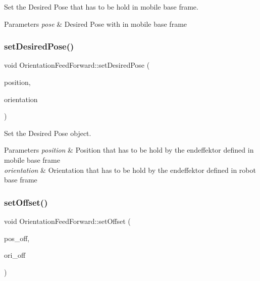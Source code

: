 Set the Desired Pose that has to be hold in mobile base frame. 


\begin{DoxyParams}{Parameters}
{\em pose} & Desired Pose with in mobile base frame \\
\hline
\end{DoxyParams}
\mbox{\label{classOrientationFeedForward_ad419aebf0df88282ca6c1dc24adbadb2}} 
\subsubsection{\texorpdfstring{set\+Desired\+Pose()}{setDesiredPose()}\hspace{0.1cm}{\footnotesize\ttfamily [2/2]}}
{\footnotesize\ttfamily void Orientation\+Feed\+Forward\+::set\+Desired\+Pose (\begin{DoxyParamCaption}\item[{Position}]{position,  }\item[{Orientation}]{orientation }\end{DoxyParamCaption})}



Set the Desired Pose object. 


\begin{DoxyParams}{Parameters}
{\em position} & Position that has to be hold by the endeffektor defined in mobile base frame \\
\hline
{\em orientation} & Orientation that has to be hold by the endeffektor defined in robot base frame \\
\hline
\end{DoxyParams}
\mbox{\label{classOrientationFeedForward_adc105d9a1fe00d6a79fcf38447202709}} 
\subsubsection{\texorpdfstring{set\+Offset()}{setOffset()}\hspace{0.1cm}{\footnotesize\ttfamily [1/2]}}
{\footnotesize\ttfamily void Orientation\+Feed\+Forward\+::set\+Offset (\begin{DoxyParamCaption}\item[{Position}]{pos\+\_\+off,  }\item[{Orientation}]{ori\+\_\+off }\end{DoxyParamCaption})}



